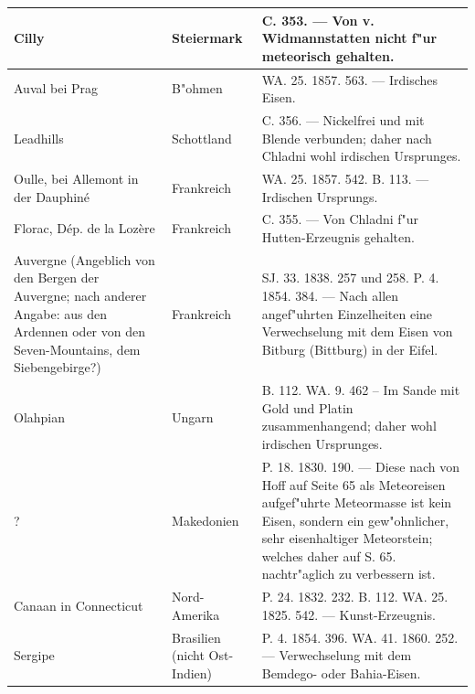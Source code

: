 \documentclass[a4paper, 8pt, oneside, polutonikogreek, german]{article}
\begin{document}
\begin{table}[H]
\begin{longtable}{|p{58mm}|p{20mm}|p{80mm}|}
        Cilly & Steiermark & C. 353. --- Von v. Widmannstatten nicht f"ur meteorisch gehalten. \\ \hline
        Auval bei Prag & B"ohmen & WA. 25. 1857. 563. --- Irdisches Eisen. \\ \hline
        Leadhills & Schottland & C. 356. --- Nickelfrei und mit Blende verbunden; daher nach Chladni wohl irdischen Ursprunges. \\ \hline
        Oulle, bei Allemont in der Dauphiné & Frankreich & WA. 25. 1857. 542. B. 113. --- Irdischen Ursprungs. \\ \hline
        Florac, Dép. de la Lozère & Frankreich & C. 355. --- Von Chladni f"ur Hutten-Erzeugnis gehalten. \\ \hline
        Auvergne (Angeblich von den Bergen der Auvergne; nach anderer Angabe: aus den Ardennen oder von den Seven-Mountains, dem Siebengebirge?) & Frankreich & SJ. 33. 1838. 257 und 258. P. 4. 1854. 384. --- Nach allen angef"uhrten Einzelheiten eine Verwechselung mit dem Eisen von Bitburg (Bittburg) in der Eifel. \\ \hline
        Olahpian & Ungarn & B. 112. WA. 9. 462 – Im Sande mit Gold und Platin zusammenhangend; daher wohl irdischen Ursprunges. \\ \hline
        ? & Makedonien & P. 18. 1830. 190. --- Diese nach von Hoff auf Seite 65 als Meteoreisen aufgef"uhrte Meteormasse ist kein Eisen, sondern ein gew"ohnlicher, sehr eisenhaltiger Meteorstein; welches daher auf S. 65. nachtr"aglich zu verbessern ist. \\ \hline
        Canaan in Connecticut & Nord-Amerika & P. 24. 1832. 232. B. 112. WA. 25. 1825. 542. --- Kunst-Erzeugnis. \\ \hline
        Sergipe & Brasilien (nicht Ost-Indien) & P. 4. 1854. 396. WA. 41. 1860. 252. --- Verwechselung mit dem Bemdego- oder Bahia-Eisen. \\ \hline
    \end{longtable}
\end{table}
\clearpage
\end{document}
